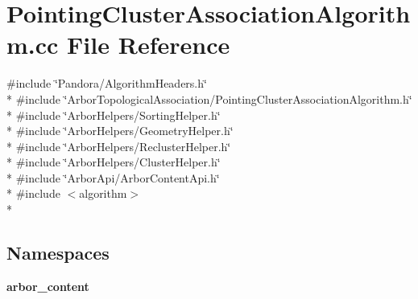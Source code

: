 \section{Pointing\+Cluster\+Association\+Algorithm.\+cc File Reference}
\label{PointingClusterAssociationAlgorithm_8cc}
{\ttfamily \#include \char`\"{}Pandora/\+Algorithm\+Headers.\+h\char`\"{}}\\*
{\ttfamily \#include \char`\"{}Arbor\+Topological\+Association/\+Pointing\+Cluster\+Association\+Algorithm.\+h\char`\"{}}\\*
{\ttfamily \#include \char`\"{}Arbor\+Helpers/\+Sorting\+Helper.\+h\char`\"{}}\\*
{\ttfamily \#include \char`\"{}Arbor\+Helpers/\+Geometry\+Helper.\+h\char`\"{}}\\*
{\ttfamily \#include \char`\"{}Arbor\+Helpers/\+Recluster\+Helper.\+h\char`\"{}}\\*
{\ttfamily \#include \char`\"{}Arbor\+Helpers/\+Cluster\+Helper.\+h\char`\"{}}\\*
{\ttfamily \#include \char`\"{}Arbor\+Api/\+Arbor\+Content\+Api.\+h\char`\"{}}\\*
{\ttfamily \#include $<$algorithm$>$}\\*
\subsection*{Namespaces}
\begin{DoxyCompactItemize}
\item 
 {\bf arbor\+\_\+content}
\end{DoxyCompactItemize}
